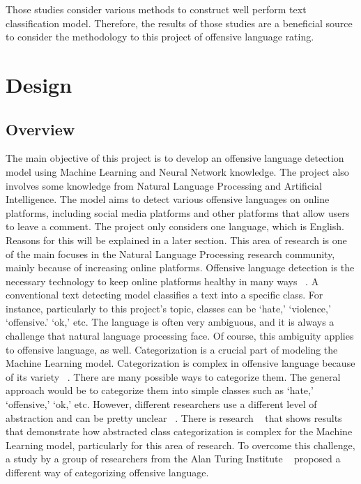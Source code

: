 \documentclass[11pt, natbib=false]{article}
\begin{document}
Those studies consider various methods to construct well perform text classification model.
Therefore, the results of those studies are a beneficial source to consider the methodology to this project of offensive language rating. 



\section{Design}
\subsection{Overview}
The main objective of this project is to develop an offensive language detection model using Machine Learning and Neural Network knowledge.
The project also involves some knowledge from Natural Language Processing and Artificial Intelligence. The model aims to detect various offensive languages on online platforms, including social media platforms and other platforms that allow users to leave a comment.
The project only considers one language, which is English.
Reasons for this will be explained in a later section.
This area of research is one of the main focuses in the Natural Language Processing research community, mainly because of increasing online platforms.
Offensive language detection is the necessary technology to keep online platforms healthy in many ways ~\cite{vidgen2019challenges}. A conventional text detecting model classifies a text into a specific class.
For instance, particularly to this project’s topic, classes can be ‘hate,’ ‘violence,’ ‘offensive.’ ‘ok,’ etc. The language is often very ambiguous, and it is always a challenge that natural language processing face.
Of course, this ambiguity applies to offensive language, as well. Categorization is a crucial part of modeling the Machine Learning model.
Categorization is complex in offensive language because of its variety ~\cite{vidgen2019challenges}.
There are many possible ways to categorize them. The general approach would be to categorize them into simple classes such as ‘hate,’ ‘offensive,’ ‘ok,’ etc. However, different researchers use a different level of abstraction and can be pretty unclear ~\cite{vidgen2019challenges}.
There is research ~\cite{malmasi2017detecting} that shows results that demonstrate how abstracted class categorization is complex for the Machine Learning model, particularly for this area of research.
To overcome this challenge, a study by a group of researchers from the Alan Turing Institute ~\cite{vidgen2019challenges} proposed a different way of categorizing offensive language.
\end{document}
